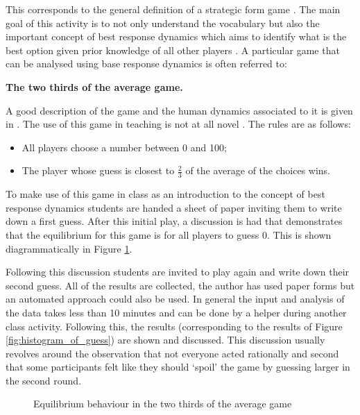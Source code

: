 \documentclass[12pt, a4paper]{article}
\begin{document}
This corresponds to the general definition of a strategic form game
\cite{Maschler2013}. The main goal of this activity is to not only understand
the vocabulary but also the important concept of best response dynamics which
aims to identify what is the best option given prior knowledge of all other
players \cite{Maschler2013}. A particular game that can be analysed using base
response dynamics is often referred to:

\begin{center}
    \textbf{The two thirds of the average game.}
\end{center}

A good description of the game and the human dynamics associated to it is given
in \cite{Nagel1995}.  The use of this game in teaching is not at all novel
\cite{TheEconomicsNetwork2013}. The rules are as follows:

\begin{itemize}
    \item All players choose a number between 0 and 100;
    \item The player whose guess is closest to \(\frac{2}{3}\) of the average
        of the choices wins.
\end{itemize}

To make use of this game in class as an introduction to the concept of best
response dynamics students are handed a sheet of paper inviting them to write
down a first guess. After this initial play, a discussion is had that
demonstrates that the equilibrium for this game is for all players to guess 0.
This is shown diagrammatically in Figure
\ref{fig:rationalisation_of_two_thirds_game}.

Following this discussion students are invited to play again and write down
their second guess. All of the results are collected, the author has used paper
forms but an automated approach could also be used. In general the input and
analysis of the data takes less than 10 minutes and can be done by a helper
during another class activity.
Following this, the results (corresponding to the results of Figure
\ref{fig:histogram_of_guess}) are shown and discussed.
This discussion usually revolves around the observation that not everyone acted
rationally and second that some participants felt like they should `spoil' the
game by guessing larger in the second round.

\begin{figure}[!hbtp]
    \centering
        
    \caption{Equilibrium behaviour in the two thirds of the average
    game}\label{fig:rationalisation_of_two_thirds_game}
\end{figure}
\end{document}
